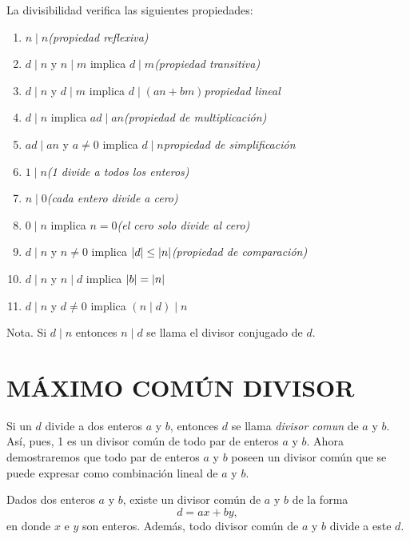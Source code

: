 \documentclass[12pt,a4paper]{book}
\begin{document}
    \begin{teorema}
        La divisibilidad verifica las siguientes propiedades:
        \begin{enumerate}
            \item[(a)] $n\mid n$\hfill \textit{(propiedad reflexiva)}
            \item[(b)] $d\mid n$ y $n\mid m$ implica $d\mid m$\hfill\textit{(propiedad transitiva)}
            \item[(c)] $d\mid n$ y $d\mid m$ implica $d\mid(an+bm)$\hfill\textit{propiedad lineal}
            \item[(d)] $d\mid n$ implica $ad\mid an$\hfill\textit{(propiedad de multiplicación)}
            \item[(e)] $ad\mid an$ y $a\neq0$ implica $d\mid n$\hfill\textit{propiedad de simplificación}
            \item[(f)] $1\mid n$\hfill\textit{(1 divide a todos los enteros)}
            \item[(g)] $n\mid0$\hfill\textit{(cada entero divide a cero)}
            \item[(h)] $0\mid n$ implica $n=0$\hfill\textit{(el cero solo divide al cero)}
            \item[(i)] $d\mid n$ y $n\neq0$ implica $\abs{d}\leq\abs{n}$\hfill\textit{(propiedad de comparación)}
            \item[(j)] $d\mid n$ y $n\mid d$ implica $\abs{b}=\abs{n}$
            \item[(k)] $d\mid n$ y $d\neq0$ implica $(n\mid d)\mid n$          
        \end{enumerate}
    \end{teorema}

    Nota. Si $d\mid n$ entonces $n\mid d$ se llama el divisor conjugado de $d$.

    \section{MÁXIMO COMÚN DIVISOR}

    Si un $d$ divide a dos enteros $a$ y $b$, entonces $d$ se llama \textit{divisor comun}
    de $a$ y $b$. Así, pues, 1 es un divisor común de todo par de enteros $a$ y $b$. Ahora
    demostraremos que todo par de enteros $a$ y $b$ poseen un divisor común que se puede expresar
    como combinación lineal de $a$ y $b$.

    \begin{teorema}
        Dados dos enteros $a$ y $b$, existe un divisor común de $a$ y $b$ de la forma
        \begin{equation*}
            d=ax+by,
        \end{equation*}
        en donde $x$ e $y$ son enteros. Además, todo divisor común de $a$ y $b$ divide a este
        $d$. 
    \end{teorema}
\end{document}

